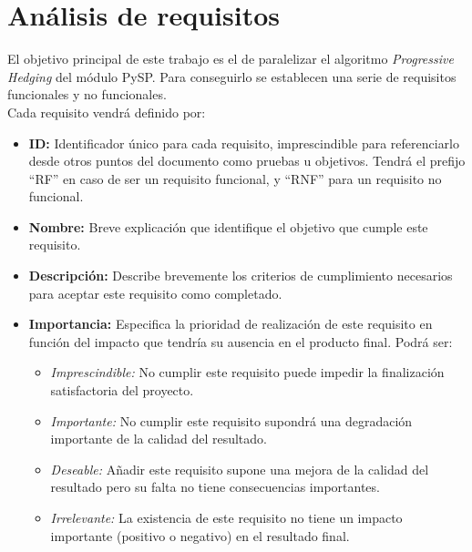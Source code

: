 \section{Análisis de requisitos}

El objetivo principal de este trabajo es el de paralelizar el algoritmo \textit{Progressive Hedging} del módulo PySP. Para conseguirlo se establecen una serie de requisitos funcionales y no funcionales.\\

Cada requisito vendrá definido por:

\begin{itemize}
    \item \textbf{ID: } Identificador único para cada requisito, imprescindible para referenciarlo desde otros puntos del documento como pruebas u objetivos. Tendrá el prefijo ``RF'' en caso de ser un requisito funcional, y ``RNF'' para un requisito no funcional.
    \item \textbf{Nombre: } Breve explicación que identifique el objetivo que cumple este requisito.
    \item \textbf{Descripción: } Describe brevemente los criterios de cumplimiento necesarios para aceptar este requisito como completado.
    \item \textbf{Importancia: } Especifica la prioridad de realización de este requisito en función del impacto que tendría su ausencia en el producto final. Podrá ser:
    \begin{itemize}
        \item \textit{Imprescindible: } No cumplir este requisito puede impedir la finalización satisfactoria del proyecto.
        \item \textit{Importante: } No cumplir este requisito supondrá una degradación importante de la calidad del resultado.
        \item \textit{Deseable: } Añadir este requisito supone una mejora de la calidad del resultado pero su falta no tiene consecuencias importantes.
        \item \textit{Irrelevante: } La existencia de este requisito no tiene un impacto importante (positivo o negativo) en el resultado final.
    \end{itemize}
\end{itemize}


